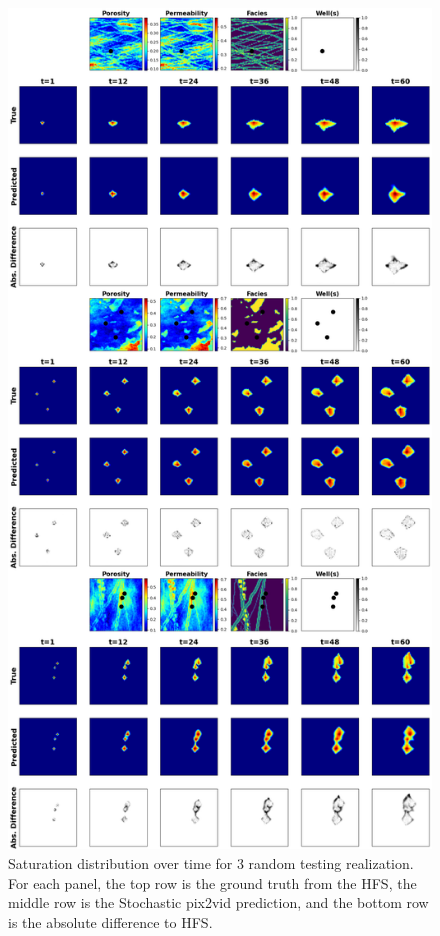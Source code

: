 \documentclass[10pt, twoside]{article}
\begin{document}
\begin{figure}
    \centering
    \includegraphics[width=\textwidth,height=0.95\textheight,keepaspectratio]{figures/test_sat.png}
    \caption{Saturation distribution over time for 3 random testing realization. For each panel, the top row is the ground truth from the HFS, the middle row is the Stochastic pix2vid prediction, and the bottom row is the absolute difference to HFS.}
    \label{test_sat}
\end{figure}
\end{document}
